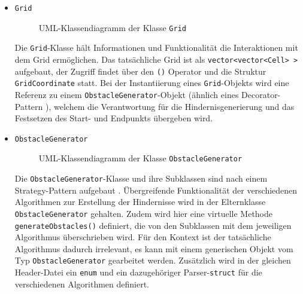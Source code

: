 \begin{itemize}
    \item \texttt{Grid} \\
    \begin{figure}[H]
        \vspace{-0.5cm}
        \centering
        
        \caption{UML-Klassendiagramm der Klasse \texttt{Grid}}
        \label{fig:uml_grid}
    \end{figure}
    Die \texttt{Grid}-Klasse hält Informationen und Funktionalität die Interaktionen mit dem Grid ermöglichen.
    Das tatsächliche Grid ist als \texttt{vector<vector<Cell> >} aufgebaut, der Zugriff findet über den \texttt{()}
    Operator und die Struktur \texttt{GridCoordinate} statt.
    Bei der Instantiierung eines \texttt{Grid}-Objekts wird eine Referenz zu einem \texttt{ObstacleGenerator}-Objekt (ähnlich eines Decorator-Pattern \cite{nesteruk2021}),
    welchem die Verantwortung für die Hindernisgenerierung und das Festsetzen des Start- und Endpunkts übergeben wird.
    \item \texttt{ObstacleGenerator} \\
    \begin{figure}[H]
        \vspace{-0.5cm}
        \centering
        
        \caption{UML-Klassendiagramm der Klasse \texttt{ObstacleGenerator}}
        \label{fig:uml_obstacle_gen}
    \end{figure}
    Die \texttt{ObstacleGenerator}-Klasse und ihre Subklassen sind nach einem Strategy-Pattern aufgebaut \cite{nesteruk2021}.
    Übergreifende Funktionalität der verschiedenen Algorithmen zur Erstellung der Hindernisse wird in der Elternklasse \texttt{Obstacle\-Generator} gehalten.
    Zudem wird hier eine virtuelle Methode \texttt{generate\-Obstacles()} definiert, die von den Subklassen mit dem jeweiligen Algorithmus überschrieben wird.
    Für den Kontext ist der tatsächliche Algorithmus dadurch irrelevant, es kann mit einem generischen Objekt vom Typ \texttt{ObstacleGenerator} gearbeitet werden.
    Zusätzlich wird in der gleichen Header-Datei ein \texttt{enum} und ein dazugehöriger Parser-\texttt{struct} für die verschiedenen Algorithmen definiert.
\end{itemize}
